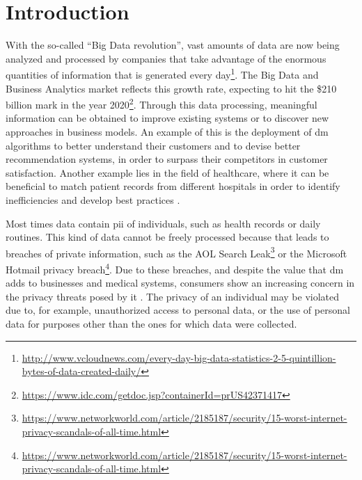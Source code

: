 %

\acresetall

\chapter{Introduction}
\label{ch:Introduction}



With the so-called ``Big Data revolution'', vast amounts of data are now being analyzed and processed by companies that take advantage of the enormous quantities of information that is generated every day\footnote{\url{http://www.vcloudnews.com/every-day-big-data-statistics-2-5-quintillion-bytes-of-data-created-daily/}}. The Big Data and Business Analytics market reflects this growth rate, expecting to hit the \$210 billion mark in the year 2020\footnote{\url{https://www.idc.com/getdoc.jsp?containerId=prUS42371417}}.
Through this data processing, meaningful information can be obtained to improve existing systems or to discover new approaches in business models. An example of this is the deployment of \ac{dm} algorithms to better understand their customers and to devise better recommendation systems, in order to surpass their competitors in customer satisfaction. Another example lies in the field of healthcare, where it can be beneficial to match patient records from different hospitals in order to identify inefficiencies and develop best practices \cite{Lu2014}. 

Most times data contain \ac{pii} of individuals, such as health records or daily routines. This kind of data cannot be freely processed because that leads to breaches of private information, such as the AOL Search Leak\footnote{\url{https://www.networkworld.com/article/2185187/security/15-worst-internet-privacy-scandals-of-all-time.html}} or the Microsoft Hotmail privacy breach\footnote{\url{https://www.networkworld.com/article/2185187/security/15-worst-internet-privacy-scandals-of-all-time.html}}. Due to these breaches, and despite the value that \ac{dm} adds to businesses and medical systems, consumers show an increasing concern in the privacy threats posed by it \cite{brankovic1999privacy}. The privacy of an individual may be violated due to, for example, unauthorized access to personal data, or the use of personal data for purposes other than the ones for which data were collected.

